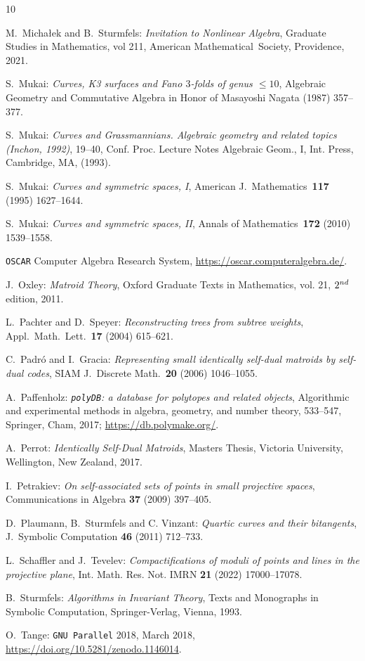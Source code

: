 \documentclass[12pt]{extarticle}
\theoremstyle{definition}
\numberwithin{theorem}{section}
\theoremstyle{plain}\newtheorem{ithm}{Theorem}
\begin{document}
\begin{thebibliography}{10}
\begin{small}
 M.~Micha{\l}ek and B.~Sturmfels: {\em Invitation to Nonlinear Algebra},
Graduate Studies in Mathematics, vol 211, American Mathematical~Society, Providence, 2021.

 S.~Mukai: {\em Curves, K3 surfaces and Fano $3$-folds of genus $\leq 10$},
Algebraic Geometry and Commutative Algebra in Honor of Masayoshi Nagata
(1987) 357--377.

 S.~Mukai:
{\em Curves and Grassmannians. Algebraic geometry and related topics (Inchon, 1992)}, 19--40, 
Conf. Proc. Lecture Notes Algebraic Geom., I, Int. Press, Cambridge, MA, (1993).

 S.~Mukai:
{\em Curves and symmetric spaces, I}, American J.~Mathematics~{\bf 117} (1995) 1627--1644. 

 S.~Mukai:
{\em Curves and symmetric spaces, II}, Annals of Mathematics~{\bf 172} (2010) 1539--1558. 

 \texttt{OSCAR} {C}omputer {A}lgebra {R}esearch {S}ystem,
 \url{https://oscar.computeralgebra.de/}.

 J.~Oxley: {\em Matroid Theory},
 Oxford Graduate Texts in Mathematics, vol. 21, $2^{\rm nd}$ edition, 2011.

 L.~Pachter and D.~Speyer:
{\em Reconstructing trees from subtree weights},
Appl.~Math.~Lett.~{\bf 17} (2004) 615--621. 

 C.~Padr\'o and I.~Gracia:
{\em Representing small identically self-dual matroids by self-dual codes},
SIAM J.~Discrete Math.~{\bf 20} (2006) 1046--1055.   

  A.~Paffenholz: {\em  {\tt polyDB}: a database for polytopes and related objects},
 Algorithmic and experimental methods in algebra, geometry, and number theory,
 533--547, Springer, Cham, 2017;   \url{https://db.polymake.org/}.

 A.~Perrot: {\em Identically Self-Dual Matroids},
Masters Thesis, Victoria University, Wellington, New Zealand, 2017.

 I.~Petrakiev: {\em On self-associated sets of points in
small projective spaces}, Communications in Algebra {\bf  37} (2009) 397--405.

 D.~Plaumann, B.~Sturmfels and C. Vinzant:
{\em Quartic curves and their bitangents}, J.~Symbolic Computation {\bf 46} (2011) 712--733.

 L.~Schaffler and J.~Tevelev:
{\em Compactifications of moduli of points and lines in the projective plane},
Int. Math. Res. Not. IMRN {\bf 21} (2022) 17000--17078.


  B.~Sturmfels: {\em Algorithms in Invariant Theory}, 
 Texts and Monographs in Symbolic Computation,
 Springer-Verlag, Vienna, 1993.
  

 O.~Tange: \texttt{GNU Parallel} 2018, March 2018, 
\url{https://doi.org/10.5281/zenodo.1146014}.


\end{small}
\end{thebibliography}
\end{document}
